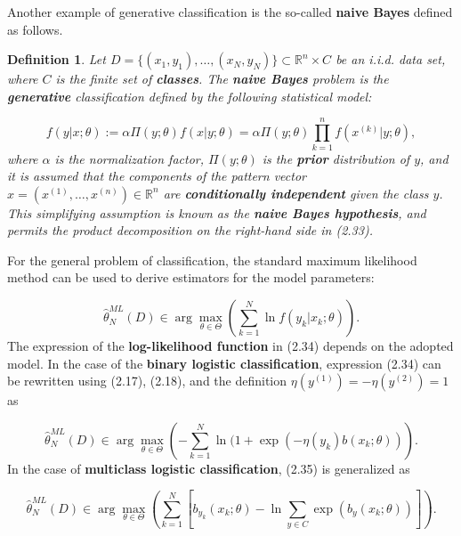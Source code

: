 \documentclass{report}
\newtheorem{definition}{Definition}[chapter]
\begin{document}
Another example of generative classification is the so-called \textbf{naive Bayes} defined as follows.

\begin{definition}
Let $D = \{(x_1,y_1),\dots,(x_N,y_N)\} \subset \mathbb{R}^n \times C$ be an i.i.d. data set, where $C$ is the finite set of \textbf{classes}. The \textbf{naive Bayes} problem is the \textbf{generative} classification defined by the following statistical model:

\begin{equation}
f(y|x;\theta) := \alpha \Pi(y;\theta) f(x|y;\theta) = \alpha \Pi(y;\theta) \prod_{k=1}^n f(x^{(k)}|y;\theta),
\end{equation}
where $\alpha$ is the normalization factor, $\Pi(y;\theta)$ is the \textbf{prior} distribution of $y$, and it is assumed that the components of the pattern vector $x = (x^{(1)},\dots,x^{(n)}) \in \mathbb{R}^n$ are \textbf{conditionally independent} given the class $y$. This simplifying assumption is known as the \textbf{naive Bayes hypothesis}, and permits the product decomposition on the right-hand side in (2.33).
\end{definition}
For the general problem of classification, the standard maximum likelihood method can be used to derive estimators for the model parameters:

\begin{equation}
\hat{\theta}^{ML}_N(D) \in \arg \max_{\theta \in \Theta} \left(\sum_{k=1}^N \ln f(y_k|x_k;\theta)\right).
\end{equation}
The expression of the \textbf{log-likelihood function} in (2.34) depends on the adopted model. In the case of the \textbf{binary logistic classification}, expression (2.34) can be rewritten using (2.17), (2.18), and the definition $\eta(y^{(1)}) = -\eta(y^{(2)}) = 1$ as

\begin{equation}
\hat{\theta}^{ML}_N(D) \in \arg \max_{\theta \in \Theta} \left(-\sum_{k=1}^N \ln(1+\exp(-\eta(y_k)b(x_k;\theta))\right).
\end{equation}
In the case of \textbf{multiclass logistic classification}, (2.35) is generalized as

\begin{equation}
\hat{\theta}^{ML}_N(D) \in \arg \max_{\theta \in \Theta} \left(
\sum_{k=1}^N\left[b_{y_k}(x_k;\theta) - \ln \sum_{y \in C} \exp(b_y(x_k;\theta))\right]\right).
\end{equation}
\end{document}
